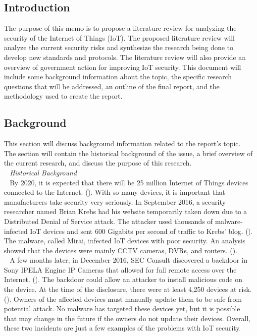 \documentclass[letterpaper, 12pt]{texMemo}
\begin{document}
\maketitle
\begin{flushleft}
\subsection*{Introduction}
The purpose of this memo is to propose a literature review for analyzing the security of the Internet of Things (IoT). 
The proposed literature review will analyze the current security risks and synthesize the research being done to develop new standards and protocols. The literature review will also provide
an overview of government action for improving IoT security.
This document will include some background information about the topic, the specific research questions that will be addressed, an outline of
the final report, and the methodology used to create the report.

\subsection*{Background}
This section will discuss background information related to the report's topic. The section will contain the historical background of the issue, a brief
overview of the current research, and discuss the purpose of this research. \\
~\newline
\textit{Historical Background}\\ 
~\newline
By 2020, it is expected that there will be 
25 million Internet of Things devices connected to the Internet. (\cite{Martinez1}). With so many devices, it is important that manufacturers take security very seriously. 
In September 2016, a security researcher named Brian Krebs had his website temporarily taken down due to a Distributed Denial of Service attack. The attacker
used thousands of malware-infected IoT devices and sent 600 Gigabits per second of traffic to Krebs' blog. (\cite{Krebs}). The malware, called Mirai, 
infected IoT devices with poor security. An analysis showed that the devices were mainly CCTV cameras, DVRs, and routers. (\cite{Incapsula}).\\
~\newline
A few months later, in December 2016, SEC Consult discovered a backdoor in Sony IPELA Engine IP Cameras that allowed for full remote access over the Internet. (\cite{sec}). The backdoor could allow an attacker
to install malicious code on the device. At the time of the disclosure, there were at least 4,250 devices at risk. (\cite{Krebs2}). Owners of the affected devices must manually update them
to be safe from potential attack. No malware has targeted these devices yet, but it is possible that may change in the future if the owners do not update their devices. Overall, these two incidents
are just a few examples of the problems with IoT security.\\


\end{flushleft}
\end{document}
